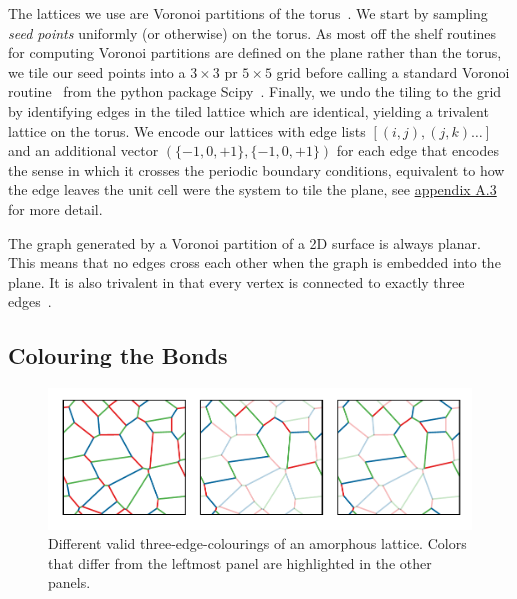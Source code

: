 The lattices we use are Voronoi partitions of the torus~\autocite{mitchellAmorphousTopologicalInsulators2018,marsalTopologicalWeaireThorpeModels2020,florescu_designer_2009}. We start by sampling \emph{seed points} uniformly (or otherwise) on the torus. As most off the shelf routines for computing Voronoi partitions are defined on the plane rather than the torus, we tile our seed points into a \(3\times3\) pr \(5\times5\) grid before calling a standard Voronoi routine~\autocite{barberQuickhullAlgorithmConvex1996} from the python package Scipy~\autocite{virtanenSciPyFundamentalAlgorithms2020}. Finally, we undo the tiling to the grid by identifying edges in the tiled lattice which are identical, yielding a trivalent lattice on the torus. We encode our lattices with edge lists \([(i,j), (j,k)\ldots]\) and an additional vector \((\{-1,0,+1\}, \{-1,0,+1\})\) for each edge that encodes the sense in which it crosses the periodic boundary conditions, equivalent to how the edge leaves the unit cell were the system to tile the plane, see \protect\hyperlink{app-lattice-generation}{appendix A.3} for more detail.

The graph generated by a Voronoi partition of a 2D surface is always planar. This means that no edges cross each other when the graph is embedded into the plane. It is also trivalent in that every vertex is connected to exactly three edges~\autocite{voronoiNouvellesApplicationsParamètres1908,watsonComputingNdimensionalDelaunay1981}.

\hypertarget{colouring-the-bonds}{%
\subsection{Colouring the Bonds}\label{colouring-the-bonds}}

\hypertarget{fig:multiple_colourings}{%
\begin{figure}
\centering
\includegraphics[width=1\textwidth,height=\textheight]{figure_code/amk_chapter/multiple_colourings/multiple_colourings}
\caption[{Colourings of an Amorphous Lattice}]{Different valid three-edge-colourings of an amorphous lattice. Colors that differ from the leftmost panel are highlighted in the other panels.}
\label{fig:multiple_colourings}
\end{figure}
}

